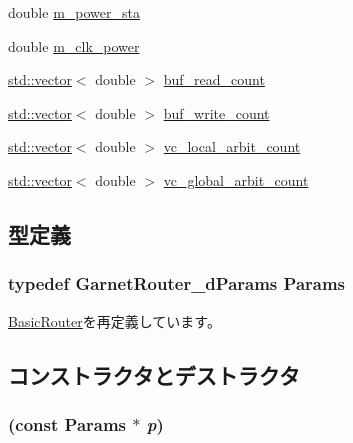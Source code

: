 \begin{DoxyCompactItemize}
double \hyperlink{classRouter__d_afe7b7b86afd10caa5129c26f7428e2b1}{m\_\-power\_\-sta}
\item 
double \hyperlink{classRouter__d_af9b18a913415250dfb3ffc57dec3612f}{m\_\-clk\_\-power}
\item 
\hyperlink{classstd_1_1vector}{std::vector}$<$ double $>$ \hyperlink{classRouter__d_ad9a59fb1bafd2a0cc7754c9fef5d8ef8}{buf\_\-read\_\-count}
\item 
\hyperlink{classstd_1_1vector}{std::vector}$<$ double $>$ \hyperlink{classRouter__d_afe43b7097a0ba6f1d4e222fc22b95408}{buf\_\-write\_\-count}
\item 
\hyperlink{classstd_1_1vector}{std::vector}$<$ double $>$ \hyperlink{classRouter__d_af297fe43c51906ad67970540c713829e}{vc\_\-local\_\-arbit\_\-count}
\item 
\hyperlink{classstd_1_1vector}{std::vector}$<$ double $>$ \hyperlink{classRouter__d_a2454cc999d0640452a6b6814406ed2ae}{vc\_\-global\_\-arbit\_\-count}
\end{DoxyCompactItemize}


\subsection{型定義}
\hypertarget{classRouter__d_a0aa71fc14ebbcbd38c18c172bdbc48eb}{
\subsubsection[{Params}]{\setlength{\rightskip}{0pt plus 5cm}typedef GarnetRouter\_\-dParams {\bf Params}}}
\label{classRouter__d_a0aa71fc14ebbcbd38c18c172bdbc48eb}


\hyperlink{classBasicRouter_af2c419269bc768b96a7bae9bfbcd3e94}{BasicRouter}を再定義しています。

\subsection{コンストラクタとデストラクタ}
\hypertarget{classRouter__d_a961ed977c934655d20a6d2ac92178e8c}{
\subsubsection[{Router\_\-d}]{ (const {\bf Params} $\ast$ {\em p})}}
\label{classRouter__d_a961ed977c934655d20a6d2ac92178e8c}



